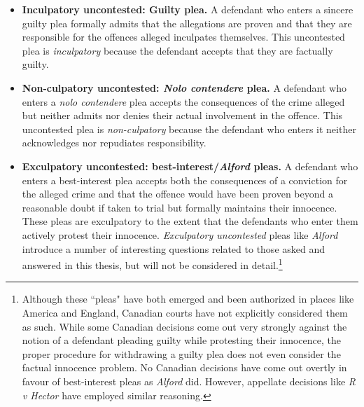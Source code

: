 \begin{itemize}

    \item \textbf{Inculpatory uncontested: Guilty plea.} A defendant who enters a sincere guilty plea formally admits that the allegations are proven and that they are responsible for the offences alleged inculpates themselves. This uncontested plea is \textit{inculpatory} because the defendant accepts that they are factually guilty.
    
    \item \textbf{Non-culpatory uncontested: \textit{Nolo contendere} plea.} A defendant who enters a \textit{nolo contendere} plea accepts the consequences of the crime alleged but neither admits nor denies their actual involvement in the offence. This uncontested plea is \textit{non-culpatory} because the defendant who enters it neither acknowledges nor repudiates responsibility.

    \item \textbf{Exculpatory uncontested: best-interest/\textit{Alford} pleas.} A defendant who enters a best-interest plea accepts both the consequences of a conviction for the alleged crime and that the offence would have been proven beyond a reasonable doubt if taken to trial but formally maintains their innocence. These pleas are exculpatory to the extent that the defendants who enter them actively protest their innocence. \textit{Exculpatory uncontested} pleas like \textit{Alford} introduce a number of interesting questions related to those asked and answered in this thesis, but will not be considered in detail.\footnote{Although these ``pleas" have both emerged and been authorized in places like America and England, Canadian courts have not explicitly considered them as such. While some Canadian decisions come out very strongly against the notion of a defendant pleading guilty while protesting their innocence, the proper procedure for withdrawing a guilty plea does not even consider the factual innocence problem. No Canadian decisions have come out overtly in favour of best-interest pleas as \textit{Alford} did. However, appellate decisions like \textit{R v Hector} have employed similar reasoning.} 
    
\end{itemize}